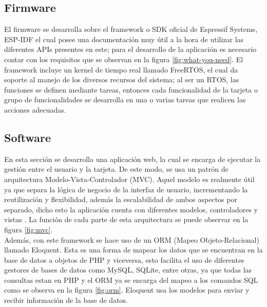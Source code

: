 \subsection{Firmware}

El firmware se desarrolla sobre el framework o SDK oficial de Espressif Systems, ESP-IDF el cual posee una documentación \cite{ES} muy útil a la hora de utilizar las diferentes APIs presentes en este; para el desarrollo de la aplicación es necesario contar con los requisitos que se observan en la figura \ref{fig:what-you-need}. El framework incluye un kernel de tiempo real llamado FreeRTOS, el cual da soporte al manejo de los diversos recursos del sistema; al ser un RTOS, las funciones se definen mediante tareas, entonces cada funcionalidad de la tarjeta o grupo de funcionalidades se desarrolla en una o varias tareas que realicen las acciones adecuadas.\\


\subsection{Software}

En esta sección se desarrolla una aplicación web, la cual se encarga de ejecutar la gestión entre el usuario y la tarjeta. De este modo, se usa un patrón de arquitectura Modelo-Vista-Controlador (MVC). Aquel modelo es realmente útil ya que separa la lógica de negocio de la interfaz de usuario, incrementando la reutilización y flexibilidad, además la escalabilidad de ambos aspectos por separado, dicho esto la aplicación cuenta con diferentes modelos, controladores y vistas \cite{MVC1}. La función de cada parte de esta arquitectura se puede observar en la figura \ref{fig:mvc}.\\


Además, con este framework se hace uso de un ORM (Mapeo Objeto-Relacional) llamado Eloquent. Esta es una forma de mapear los datos que se encuentran en la base de datos a objetos de PHP y viceversa, esto facilita el uso de diferentes gestores de bases de datos como MySQL, SQLite, entre otras, ya que todas las consultas estan en PHP y el ORM ya se encarga del mapeo a los comandos SQL como se observa en la figura \ref{fig:orm}. Eloquent usa los modelos para enviar y recibir información de la base de datos\cite{Eloq}.\\


